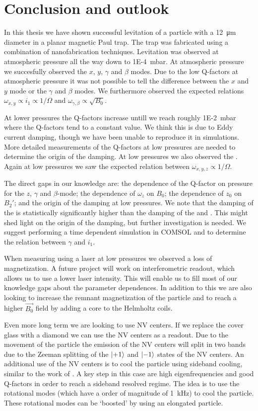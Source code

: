 \chapter{Conclusion and outlook}
\label{chap:conclusion}
In this thesis we have shown successful levitation of a  particle with a \qty{12}{\micro\meter} diameter in a planar magnetic Paul trap. The trap was fabricated using a combination of nanofabrication techniques. Levitation was observed at atmospheric pressure all the way down to \qty{1E-4}{\milli\bar}. At atmospheric pressure we succesfully observed the $x$, $y$, $\gamma$ and $\beta$ modes. Due to the low Q-factors at atmospheric pressure it was not possible to tell the difference between the $x$ and $y$ mode or the $\gamma$ and $\beta$ modes. We furthermore observed the expected relations $\omega_{x,y} \propto i_1 \propto 1/\Omega$ and $\omega_{\gamma,\beta} \propto \sqrt{B_0}$.

At lower pressures the Q-factors increase untill we reach roughly \qty{1E-2}{\milli\bar} where the Q-factors tend to a constant value. We think this is due to Eddy current damping, though we have been unable to reproduce it in simulations. More detailed measurements of the Q-factors at low pressures are needed to determine the origin of the damping. At low pressures we also observed the \zmode. Again at low pressures we saw the expected relation between $\omega_{x,y,z} \propto 1/\Omega$.

The direct gaps in our knowledge are: the dependence of the Q-factor on pressure for the $z$, $\gamma$ and $\beta$-mode; the dependence of $\omega_z$ on $B_0$; the dependence of $z_0$ on $B_2'$; and the origin of the damping at low pressures. We note that the damping of the \zmode is statistically significantly higher than the damping of the \xmode and \ymode. This might shed light on the origin of the damping, but further investigation is needed. We suggest performing a time dependent simulation in COMSOL and to determine the relation between $\gamma$ and $i_1$.

When measuring using a laser at low pressures we observed a loss of magnetization. A future project will work on interferometric readout, which allows us to use a lower laser intensity. This will enable us to fill most of our knowledge gaps about the parameter dependences. In addition to this we are also looking to increase the remnant magnetization of the particle and to reach a higher $\vec{B_0}$ field by adding a core to the Helmholtz coils.

Even more long term we are looking to use NV centers. If we replace the cover glass with a diamond we can use the NV centers as a readout. Due to the movement of the particle the emission of the NV centers will split in two bands due to the Zeeman splitting of the $\ket{+1}$ and $\ket{-1}$ states of the NV centers. An additional use of the NV centers is to cool the particle using sideband cooling, similar to the work of \textcite{delord_spin-cooling_2020}. A key step in this case are high eigenfrequencies and good Q-factors in order to reach a sideband resolved regime. The idea is to use the rotational modes (which have a order of magnitude of \qty{1}{\kilo\hertz}) to cool the particle. These rotational modes can be `boosted' by using an elongated particle\cite{huillery_spin-mechanics_2020}.
